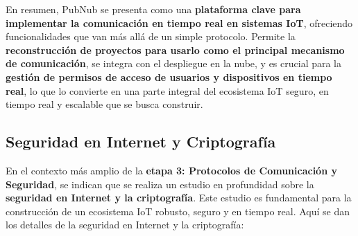 \documentclass{report}
\begin{document}
En resumen, PubNub se presenta como una \textbf{plataforma clave para implementar la comunicación en tiempo real en sistemas IoT}, 
ofreciendo funcionalidades que van más allá de un simple protocolo. Permite la \textbf{reconstrucción de proyectos para usarlo como el principal 
mecanismo de comunicación}, se integra con el despliegue en la nube, y es crucial para la \textbf{gestión de permisos de acceso de usuarios y 
dispositivos en tiempo real}, lo que lo convierte en una parte integral del ecosistema IoT seguro, en tiempo real y escalable que se busca construir.

\subsection{Seguridad en Internet y Criptografía}
En el contexto más amplio de la \textbf{etapa 3: Protocolos de Comunicación y Seguridad}, se  indican que se realiza un estudio en profundidad 
sobre la \textbf{seguridad en Internet y la criptografía}. Este estudio es fundamental para la construcción de un ecosistema IoT robusto, seguro y en 
tiempo real. Aquí se dan los detalles de la seguridad en Internet y la criptografía:
\end{document}

